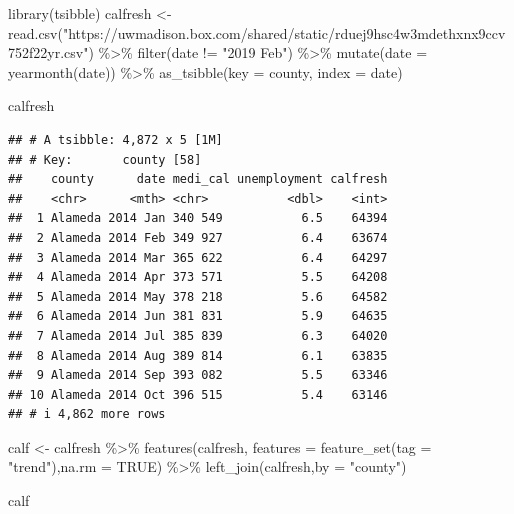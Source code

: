 \documentclass[
]{article}
\newenvironment{Shaded}{\begin{snugshade}}{\end{snugshade}}
\newcommand{\AttributeTok}[1]{\textcolor[rgb]{0.77,0.63,0.00}{#1}}
\newcommand{\ConstantTok}[1]{\textcolor[rgb]{0.00,0.00,0.00}{#1}}
\newcommand{\FunctionTok}[1]{\textcolor[rgb]{0.00,0.00,0.00}{#1}}
\newcommand{\NormalTok}[1]{#1}
\newcommand{\OtherTok}[1]{\textcolor[rgb]{0.56,0.35,0.01}{#1}}
\newcommand{\SpecialCharTok}[1]{\textcolor[rgb]{0.00,0.00,0.00}{#1}}
\newcommand{\StringTok}[1]{\textcolor[rgb]{0.31,0.60,0.02}{#1}}
\begin{document}
\begin{Shaded}
\begin{Highlighting}[]
\FunctionTok{library}\NormalTok{(tsibble)}
\NormalTok{calfresh }\OtherTok{\textless{}{-}} \FunctionTok{read.csv}\NormalTok{(}\StringTok{"https://uwmadison.box.com/shared/static/rduej9hsc4w3mdethxnx9ccv752f22yr.csv"}\NormalTok{) }\SpecialCharTok{\%\textgreater{}\%}
  \FunctionTok{filter}\NormalTok{(date }\SpecialCharTok{!=} \StringTok{"2019 Feb"}\NormalTok{) }\SpecialCharTok{\%\textgreater{}\%}
  \FunctionTok{mutate}\NormalTok{(}\AttributeTok{date =} \FunctionTok{yearmonth}\NormalTok{(date)) }\SpecialCharTok{\%\textgreater{}\%}
  \FunctionTok{as\_tsibble}\NormalTok{(}\AttributeTok{key =}\NormalTok{ county, }\AttributeTok{index =}\NormalTok{ date)}

\NormalTok{calfresh }
\end{Highlighting}
\end{Shaded}

\begin{verbatim}
## # A tsibble: 4,872 x 5 [1M]
## # Key:       county [58]
##    county      date medi_cal unemployment calfresh
##    <chr>      <mth> <chr>           <dbl>    <int>
##  1 Alameda 2014 Jan 340 549           6.5    64394
##  2 Alameda 2014 Feb 349 927           6.4    63674
##  3 Alameda 2014 Mar 365 622           6.4    64297
##  4 Alameda 2014 Apr 373 571           5.5    64208
##  5 Alameda 2014 May 378 218           5.6    64582
##  6 Alameda 2014 Jun 381 831           5.9    64635
##  7 Alameda 2014 Jul 385 839           6.3    64020
##  8 Alameda 2014 Aug 389 814           6.1    63835
##  9 Alameda 2014 Sep 393 082           5.5    63346
## 10 Alameda 2014 Oct 396 515           5.4    63146
## # i 4,862 more rows
\end{verbatim}

\begin{Shaded}
\begin{Highlighting}[]
\NormalTok{calf }\OtherTok{\textless{}{-}}\NormalTok{ calfresh }\SpecialCharTok{\%\textgreater{}\%}
  \FunctionTok{features}\NormalTok{(calfresh, }\AttributeTok{features =} \FunctionTok{feature\_set}\NormalTok{(}\AttributeTok{tag =} \StringTok{"trend"}\NormalTok{),}\AttributeTok{na.rm =} \ConstantTok{TRUE}\NormalTok{) }\SpecialCharTok{\%\textgreater{}\%}
  \FunctionTok{left\_join}\NormalTok{(calfresh,}\AttributeTok{by =} \StringTok{"county"}\NormalTok{)}

\NormalTok{calf}
\end{Highlighting}
\end{Shaded}
\end{document}
